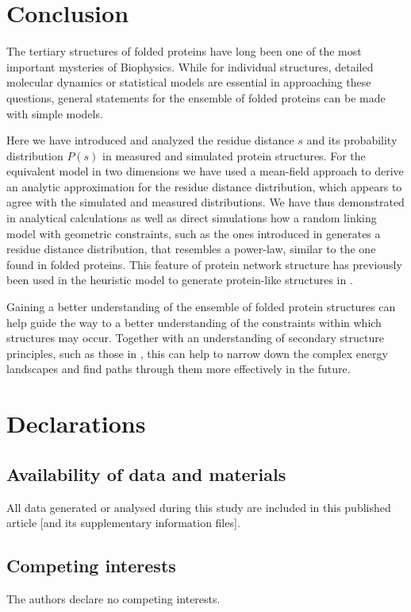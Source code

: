 \documentclass[
reprint,
twocolumn,
amsmath,amssymb,superscriptaddress,aps,
pre]{revtex4-1}
\begin{document}
\section*{Conclusion}
The tertiary structures of folded proteins have long been one of the most important mysteries of Biophysics. While for individual structures, detailed molecular dynamics or statistical models are essential in approaching these questions, general statements for the ensemble of folded proteins can be made with simple models.

Here we have introduced and analyzed the residue distance $s$ and its probability distribution $P(s)$ in measured and simulated protein structures. For the equivalent model in two dimensions we have used a mean-field approach to derive an analytic approximation for the residue distance distribution, which appears to agree with the simulated and measured distributions.
We have thus demonstrated in analytical calculations as well as direct simulations how a random linking model with geometric constraints, such as the ones introduced in \cite{molkenthin2016scaling, molkenthin2020self} generates a residue distance distribution, that resembles a power-law, similar to the one found in folded proteins. This feature of protein network structure has previously been used in the heuristic model to generate protein-like structures in \cite{bartoli2008effect}.

Gaining a better understanding of the ensemble of folded protein structures can help guide the way to a better understanding of the constraints within which structures may occur. Together with an understanding of secondary structure principles, such as those in
\cite{Danielsson2010, Molkenthin2011}, this can help to narrow down the complex energy landscapes and find paths through them more effectively in the future.

\section*{Declarations}
\subsection{Availability of data and materials}
All data generated or analysed during this study are included in this published article [and its supplementary information files].
\subsection{Competing interests}
The authors declare no competing interests.
\end{document}
